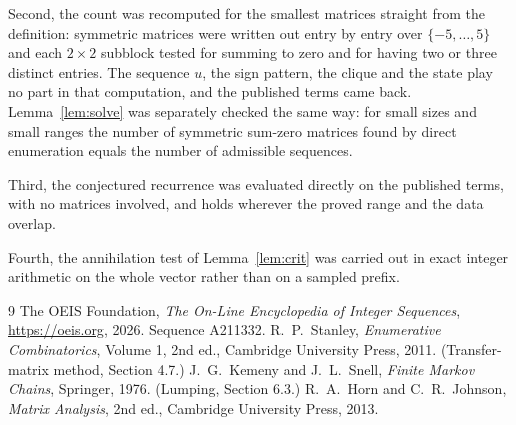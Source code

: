 \documentclass[11pt,a4paper]{article}
\theoremstyle{plain}
\theoremstyle{definition}
\begin{document}
Second, the count was recomputed for the smallest matrices straight from the definition:
symmetric matrices were written out entry by entry over $\{-5,\dots,5\}$ and each
$2\times2$ subblock tested for summing to zero and for having two or three distinct entries. The
sequence $u$, the sign pattern, the clique and the state play no part in that computation, and
the published terms came back. Lemma~\ref{lem:solve} was separately checked the same way: for
small sizes and small ranges the number of symmetric sum-zero matrices found by direct
enumeration equals the number of admissible sequences.

Third, the conjectured recurrence was evaluated directly on the published terms, with no
matrices involved, and holds wherever the proved range and the data overlap.

Fourth, the annihilation test of Lemma~\ref{lem:crit} was carried out in exact integer
arithmetic on the whole vector rather than on a sampled prefix.

\begin{thebibliography}{9}
 The OEIS Foundation, \emph{The On-Line Encyclopedia of Integer
Sequences}, \url{https://oeis.org}, 2026. Sequence A211332.
 R.~P.~Stanley, \emph{Enumerative Combinatorics}, Volume 1, 2nd ed.,
Cambridge University Press, 2011. (Transfer-matrix method, Section 4.7.)
 J.~G.~Kemeny and J.~L.~Snell, \emph{Finite Markov Chains}, Springer, 1976.
(Lumping, Section 6.3.)
 R.~A.~Horn and C.~R.~Johnson, \emph{Matrix Analysis}, 2nd ed., Cambridge
University Press, 2013.
\end{thebibliography}
\end{document}
